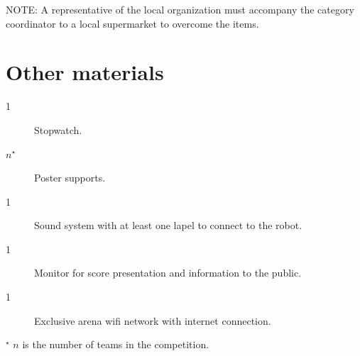 \documentclass[11pt, twoside, openright, a4paper, chapterprefix]{article}
\begin{document}

NOTE: A representative of the local organization must accompany the category coordinator to a local supermarket to overcome the items.

\section{Other materials}

\begin{description}
    \item [1] Stopwatch.
    \item [$n$${}^\star$] Poster supports.
    \item [1] Sound system with at least one lapel to connect to the robot.
    \item [1] Monitor for score presentation and information to the public.
    \item [1] Exclusive arena wifi network with internet connection.
\end{description}
${}^\star$ $n$ is the number of teams in the competition.
\end{document}
